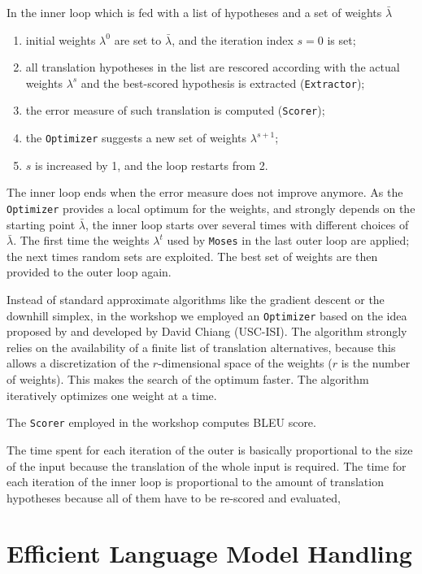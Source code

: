 \documentclass[11pt]{report}
\theoremstyle{plain}
\begin{document}
{In the inner loop which  is fed with a list of hypotheses and a set of weights $\bar \lambda$
\begin{enumerate}
\item initial weights $\lambda^0$ are set to $\bar \lambda$, and the iteration index $s=0$ is set;
\item all translation hypotheses in the list are rescored according with the actual weights $\lambda^s$
and the best-scored hypothesis is extracted ({\tt Extractor});
\item the error measure of such translation is computed ({\tt Scorer});
\item the {\tt Optimizer} suggests a new set of weights $\lambda^{s+1}$;
\item $s$ is increased by 1, and the loop restarts from 2.
\end{enumerate}
The inner loop ends when the error measure does not improve anymore.
As the {\tt Optimizer} provides a local optimum for the weights, and strongly depends on the starting point $\bar \lambda$, the inner loop starts over several  times with different choices of $\bar \lambda$. The first time the weights $\lambda^t$ used by {\tt Moses} in the last outer loop are applied; the next times random sets are exploited. The best set of weights are then provided to the outer loop again.

Instead of standard approximate algorithms like the gradient descent or the downhill simplex, in the workshop we employed an {\tt Optimizer} based on the idea proposed by \cite{och:03} and developed by David Chiang (USC-ISI). The algorithm strongly relies on the availability of a finite list of translation alternatives, because this allows a discretization of the $r$-dimensional space of the weights ($r$ is the number of weights). This makes the search of the optimum  faster. The algorithm iteratively optimizes one weight at a time.

The {\tt Scorer} employed in the workshop computes BLEU score.

The time spent for each iteration of the outer is basically proportional to the size of the input  because the translation of the whole input is required. The time for each iteration of the inner loop is proportional to the amount of translation hypotheses because all of them have to be re-scored and evaluated,



\section{Efficient Language Model Handling}

}
\end{document}
